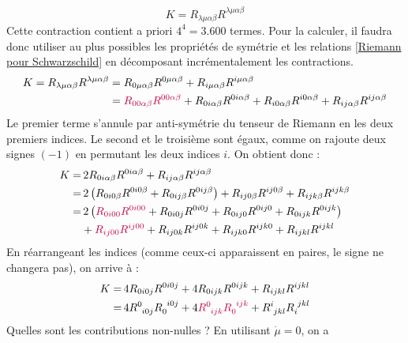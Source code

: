 \begin{equation}
    K = R_{\lambda \mu \alpha \beta} R^{\lambda\mu\alpha\beta}
\end{equation}
Cette contraction contient a priori $4^4 = 3.600$ termes. Pour la calculer, il faudra donc utiliser au plus possibles les propriétés de symétrie et les relations \ref{Riemann pour Schwarzschild} en décomposant incrémentalement les contractions.
\begin{align}
    K = R_{\lambda\mu\alpha\beta} R^{\lambda\mu\alpha\beta} &= R_{0 \mu \alpha\beta} R^{0\mu\alpha\beta} + R_{i\mu\alpha\beta} R^{i\mu\alpha\beta}\\
    &= \textcolor{purple}{R_{00\alpha\beta} R^{00\alpha\beta}} + R_{0i\alpha\beta} R^{0i\alpha\beta} + R_{i0\alpha\beta} R^{i0\alpha\beta} + R_{ij\alpha\beta} R^{ij\alpha\beta}
\end{align}
Le premier terme s'annule par anti-symétrie du tenseur de Riemann en les deux premiers indices. Le second et le troisième sont égaux, comme on rajoute deux signes $(-1)$ en permutant les deux indices $i$. On obtient donc :
\begin{align}
    K =& \, 2 R_{0 i\alpha\beta} R^{0 i\alpha\beta} + R_{ij\alpha\beta} R^{ij\alpha\beta}\\
    =& \,  2 \left( R_{0 i 0\beta} R^{0 i0\beta} + R_{0 ij\beta} R^{0 ij\beta} \right)  + R_{ij0\beta} R^{ij0\beta} + R_{ijk\beta} R^{ijk\beta} \\
    =& \,2 \left( \textcolor{purple}{R_{0 i 00} R^{0 i00}} +  R_{0 i 0j} R^{0 i0j} + R_{0 ij0} R^{0 ij0} + R_{0 ijk} R^{0 ijk}\right) \\
    &+ \textcolor{purple}{R_{ij00} R^{ij00}} + R_{ij0k} R^{ij0k} + R_{ijk0} R^{ijk0} + R_{ijkl} R^{ijkl} 
\end{align}
En réarrangeant les indices (comme ceux-ci apparaissent en paires, le signe ne changera pas), on arrive à :
\begin{align}
    K =& \, 4  R_{0 i 0j} R^{0 i0j} + 4 R_{0 ijk} R^{0 ijk} + R_{ijkl} R^{ijkl} \\
    =& \, 4  R\indices{^0_{i 0j}} R\indices{_0^{ i0j}} + 4 \purple{R\indices{^0_{ ijk}} R\indices{_0^{ ijk}}} + R\indices{^i_{jkl}} R\indices{_i^{jkl}}
\end{align}
Quelles sont les contributions non-nulles ? En utilisant $\dot{\mu} = 0$, on a
